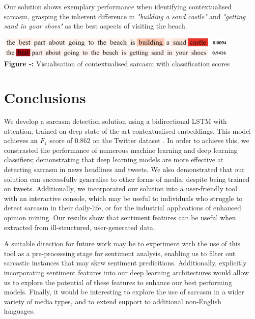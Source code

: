 \documentclass[12pt,a4paper]{article}
\begin{document}
\noindent Our solution shows exemplary performance when identifying contextualised sarcasm, grasping the inherent difference in \textit{"building a sand castle"} and \textit{"getting sand in your shoes"} as the best aspects of visiting the beach.\\\vspace{-16pt}


\begin{center}
	\hspace{-1cm}\includegraphics[width=0.9\textwidth]{Images/contextual_example.png}\\
	\centering\textbf{Figure -:} Visualisation of contextualised sarcasm with classification scores
\end{center}

\section{Conclusions}\vspace{-4.2pt}
\noindent We develop a sarcasm detection solution using a bidirectional LSTM with attention, trained on deep state-of-the-art contextualised embeddings. This model achieves an $F_1$ score of 0.862 on the Twitter dataset \cite{ptavcek2014sarcasm}. In order to achieve this, we constrasted the performance of numerous machine learning and deep learning classifiers; demonstrating that deep learning models are more effective at detecting sarcasm in news headlines and tweets. We also demonstrated that our solution can successfully generalise to other forms of media, despite being trained on tweets. Additionally, we incorporated our solution into a user-friendly tool with an interactive console, which may be useful to individuals who struggle to detect sarcasm in their daily-life, or for the industrial applications of enhanced opinion mining. Our results show that sentiment features can be useful when extracted from ill-structured, user-generated data.

A suitable direction for future work may be to experiment with the use of this tool as a pre-processing stage for sentiment analysis, enabling us to filter out sarcastic instances that may skew sentiment predicitions. Additionally, explicitly incorporating sentiment features into our deep learning architectures would allow us to explore the potential of these features to enhance our best performing models. Finally, it would be interesting to explore the use of sarcasm in a wider variety of media types, and to extend support to additional non-English languages. \\
\end{document}
